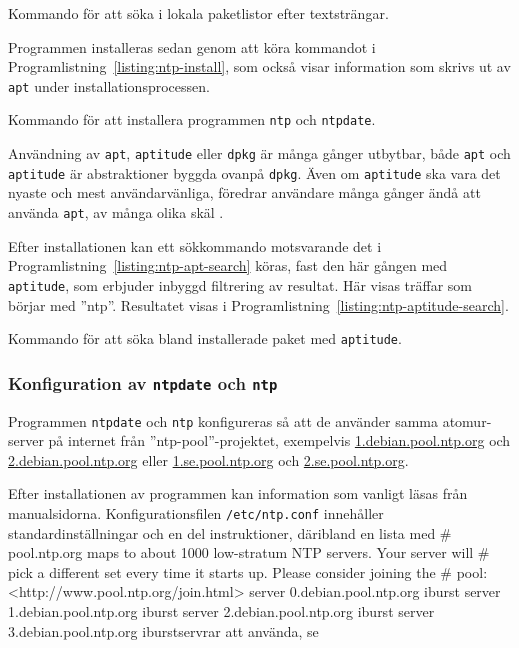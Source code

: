 \begin{listing}[H]
\caption{Kommando för att söka i lokala paketlistor efter textsträngar.}
\label{listing:ntp-apt-search}
\end{listing}


Programmen installeras sedan genom att köra kommandot i
Programlistning~\ref{listing:ntp-install}, som också visar information som skrivs
ut av \texttt{apt} under installationsprocessen.

\begin{listing}[H]
\caption{Kommando för att installera programmen \texttt{ntp} och \texttt{ntpdate}.}
\label{listing:ntp-install}
\end{listing}


Användning av \texttt{apt}, \texttt{aptitude} eller
\texttt{dpkg} är många gånger utbytbar, både \texttt{apt} och \texttt{aptitude}
är abstraktioner byggda ovanpå \texttt{dpkg}. Även om \texttt{aptitude} ska vara
det nyaste och mest användarvänliga, föredrar användare många gånger ändå
att använda \texttt{apt}, av många olika skäl \cite{superuser:aptitude-apt}.

Efter installationen kan ett sökkommando motsvarande det i
Programlistning~\ref{listing:ntp-apt-search} köras, fast den här gången med
\texttt{aptitude}, som erbjuder inbyggd filtrering av resultat. Här visas
träffar som börjar med ''ntp''. Resultatet visas i
Programlistning~\ref{listing:ntp-aptitude-search}.

\begin{listing}[H]
\caption{Kommando för att söka bland installerade paket med \texttt{aptitude}.}
\label{listing:ntp-aptitude-search}
\end{listing}

\subsubsection{Konfiguration av \texttt{ntpdate} och \texttt{ntp}}
Programmen \texttt{ntpdate} och \texttt{ntp} konfigureras så att de använder
samma atomur-server på internet från ''ntp-pool''-projektet, exempelvis
\url{1.debian.pool.ntp.org} och \url{2.debian.pool.ntp.org} eller
\url{1.se.pool.ntp.org} och \url{2.se.pool.ntp.org}.

Efter installationen av programmen kan information som vanligt läsas från
manualsidorna. Konfigurationsfilen \texttt{/etc/ntp.conf} innehåller 
standardinställningar och en del instruktioner, däribland en lista med
# pool.ntp.org maps to about 1000 low-stratum NTP servers.  Your server will
# pick a different set every time it starts up.  Please consider joining the
# pool: <http://www.pool.ntp.org/join.html>
server 0.debian.pool.ntp.org iburst
server 1.debian.pool.ntp.org iburst
server 2.debian.pool.ntp.org iburst
server 3.debian.pool.ntp.org iburstservrar att använda, se 
